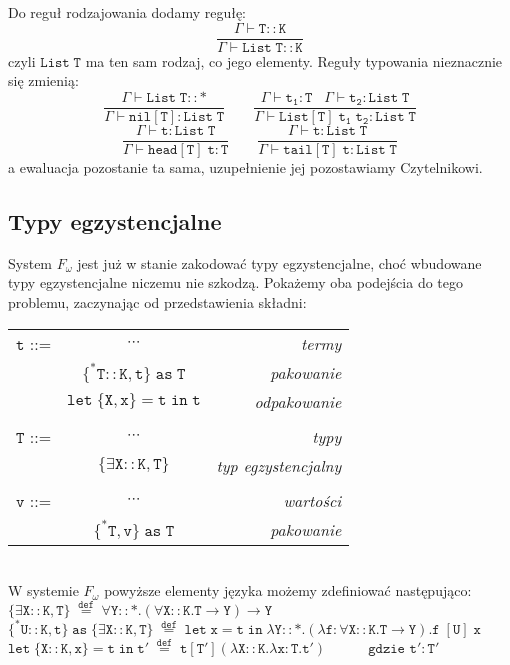 \documentclass[11pt,leqno]{article}
\begin{document}
Do reguł rodzajowania dodamy regułę:
 	\[\mathtt{ \frac{\Gamma \vdash T::K}{\Gamma \vdash List\;T::K}
		}
	\]
czyli $\mathtt{List\;T}$ ma ten sam rodzaj, co jego elementy.
Reguły typowania nieznacznie się zmienią:
 	\[\mathtt{ \frac{\Gamma \vdash List\;T :: \ast}{\Gamma \vdash nil[T] : List\;T } \qquad \frac{\Gamma \vdash t_1:T \;\;\;\Gamma \vdash t_2:List\;T}{\Gamma \vdash List[T]\;t_1\;t_2:List\;T}
		}
	\]
 	\[\mathtt{ \frac{\Gamma \vdash t:List\;T }{\Gamma \vdash head[T]\;t : T } \qquad \frac{\Gamma \vdash t:List\;T }{\Gamma \vdash tail[T]\;t : List\;T }
		}
	\]
a ewaluacja pozostanie ta sama, uzupełnienie jej pozostawiamy Czytelnikowi.
\subsection{Typy egzystencjalne}

System $F_\omega$ jest już w stanie zakodować typy egzystencjalne, choć wbudowane typy egzystencjalne niczemu nie szkodzą. Pokażemy oba podejścia do tego problemu, zaczynając od przedstawienia składni: \\

\begin{tabular}{| l c r |}
  \hline
  $\mathtt{t}$ ::= & $\cdots$ & \textit{termy}  \\
   & $\mathtt{\{^*T::K,t\}\;as\;T}$ & \textit{pakowanie} \\
   & $\mathtt{let\;\{X,x\}=t\;in\;t}$ & \textit{odpakowanie} \\
   & & \\
  $\mathtt{T}$ ::= & $\cdots$ & \textit{typy}  \\
   & $\mathtt{\{\exists X::K,T\}}$ & \textit{typ egzystencjalny} \\
   & & \\
  $\mathtt{v}$ ::= & $\cdots$ & \textit{wartości}  \\
   & $\mathtt{\{^*T,v\}\;as\;T}$ & \textit{pakowanie} \\
  \hline
\end{tabular} \\

W systemie $F_\omega$ powyższe elementy języka możemy zdefiniować następująco: \\
$\mathtt{\{\exists X::K,T\}\;\overset{def}{=}\;\forall Y::\ast.(\forall X::K.T \rightarrow Y) \rightarrow Y}$ \\
$\mathtt{\{^*U::K,t\}\;as\; \{\exists X::K,T\}\; \overset{def}{=} \;let\;x=t\;in\;\lambda Y::\ast.(\lambda f:\forall X::K.T \rightarrow Y) .f\;[U]\;x}$ \\
$\mathtt{let\;\{X::K,x\}=t\;in\;t'\;\overset{def}{=}\;t[T'](\lambda X::K.\lambda x:T.t')\hspace{3em} \text{gdzie $\mathtt{t':T'}$} }$ \\ \\
\end{document}

